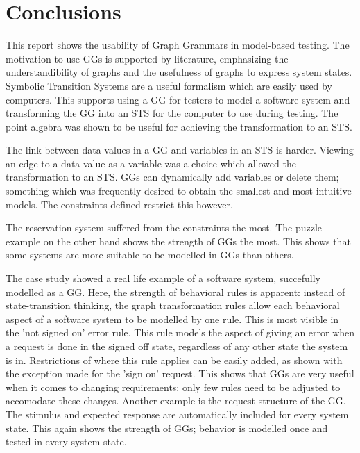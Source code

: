\section{Conclusions}

This report shows the usability of Graph Grammars in model-based testing. The motivation to use GGs is supported by literature, emphasizing the understandibility of graphs and the usefulness of graphs to express system states. Symbolic Transition Systems are a useful formalism which are easily used by computers. This supports using a GG for testers to model a software system and transforming the GG into an STS for the computer to use during testing. The point algebra was shown to be useful for achieving the transformation to an STS.

The link between data values in a GG and variables in an STS is harder. Viewing an edge to a data value as a variable was a choice which allowed the transformation to an STS. GGs can dynamically add variables or delete them; something which was frequently desired to obtain the smallest and most intuitive models. The constraints defined restrict this however. 

The reservation system suffered from the constraints the most. The puzzle example on the other hand shows the strength of GGs the most. This shows that some systems are more suitable to be modelled in GGs than others. 

The case study showed a real life example of a software system, succefully modelled as a GG. Here, the strength of behavioral rules is apparent: instead of state-transition thinking, the graph transformation rules allow each behavioral aspect of a software system to be modelled by one rule. This is most visible in the 'not signed on' error rule. This rule models the aspect of giving an error when a request is done in the signed off state, regardless of any other state the system is in. Restrictions of where this rule applies can be easily added, as shown with the exception made for the 'sign on' request. This shows that GGs are very useful when it comes to changing requirements: only few rules need to be adjusted to accomodate these changes. Another example is the request structure of the GG. The stimulus and expected response are automatically included for every system state. This again shows the strength of GGs; behavior is modelled once and tested in every system state. 

